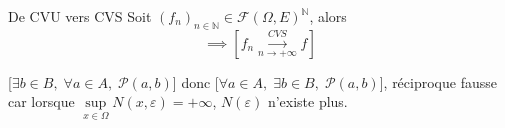 
\begin{Prop}{De CVU vers CVS}{}
Soit $(f_n) _{n \in \mathbb{N}} \in \mathscr{F}(\Omega, E) ^{\mathbb{N}}$, alors 
\begin{equation}
  [f_n  \overset{CVU}{\underset{n \to +\infty}{\longrightarrow}} f] \implies
  [f_n  \overset{CVS}{\underset{n \to +\infty}{\longrightarrow}} f]
\end{equation}
\end{Prop}

\begin{myproof}{}{}
  [$\exists b\in B,\; \forall a \in A,\; \mathscr{P}(a,b)$] donc [$\forall a\in A, \; \exists b\in B,\; \mathscr{P}(a,b)$], réciproque fausse car lorsque $\underset{x \in \Omega}{\sup} N(x, \varepsilon)=+\infty$, $N(\varepsilon)$ n'existe plus.
\end{myproof}





